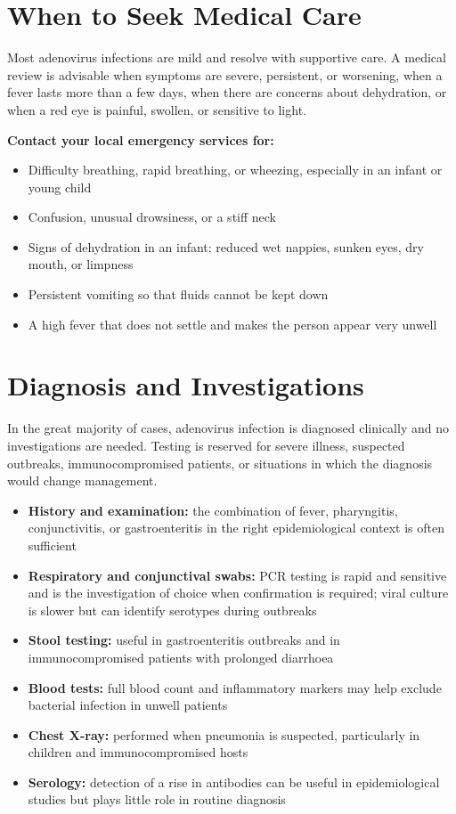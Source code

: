 \section*{When to Seek Medical Care}
Most adenovirus infections are mild and resolve with supportive care. A medical review is advisable when symptoms are severe, persistent, or worsening, when a fever lasts more than a few days, when there are concerns about dehydration, or when a red eye is painful, swollen, or sensitive to light.

\textbf{Contact your local emergency services for:}
\begin{itemize}
    \item Difficulty breathing, rapid breathing, or wheezing, especially in an infant or young child
    \item Confusion, unusual drowsiness, or a stiff neck
    \item Signs of dehydration in an infant: reduced wet nappies, sunken eyes, dry mouth, or limpness
    \item Persistent vomiting so that fluids cannot be kept down
    \item A high fever that does not settle and makes the person appear very unwell
\end{itemize}

\section*{Diagnosis and Investigations}
In the great majority of cases, adenovirus infection is diagnosed clinically and no investigations are needed. Testing is reserved for severe illness, suspected outbreaks, immunocompromised patients, or situations in which the diagnosis would change management.

\begin{itemize}
    \item \textbf{History and examination:} the combination of fever, pharyngitis, conjunctivitis, or gastroenteritis in the right epidemiological context is often sufficient
    \item \textbf{Respiratory and conjunctival swabs:} PCR testing is rapid and sensitive and is the investigation of choice when confirmation is required; viral culture is slower but can identify serotypes during outbreaks
    \item \textbf{Stool testing:} useful in gastroenteritis outbreaks and in immunocompromised patients with prolonged diarrhoea
    \item \textbf{Blood tests:} full blood count and inflammatory markers may help exclude bacterial infection in unwell patients
    \item \textbf{Chest X-ray:} performed when pneumonia is suspected, particularly in children and immunocompromised hosts
    \item \textbf{Serology:} detection of a rise in antibodies can be useful in epidemiological studies but plays little role in routine diagnosis
\end{itemize}

